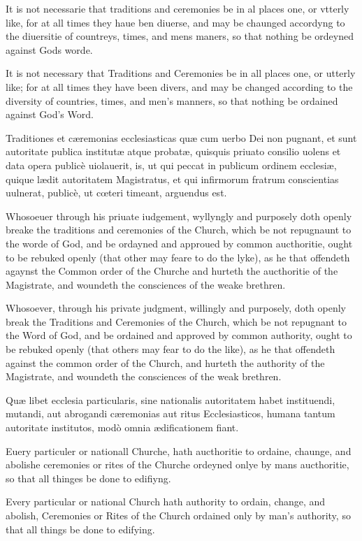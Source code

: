 It is not necessarie that traditions and ceremonies be in al places one, or vtterly like, for at all times they haue ben diuerse, and may be chaunged accordyng to the diuersitie of countreys, times, and mens maners, so that nothing be ordeyned against Gods worde.

It is not necessary that Traditions and Ceremonies be in all places one, or utterly like; for at all times they have been divers, and may be changed according to the diversity of countries, times, and men's manners, so that nothing be ordained against God's Word.

Traditiones et cæremonias ecclesiasticas quæ cum uerbo Dei non pugnant, et sunt autoritate publica institutæ atque probatæ, quisquis priuato consilio uolens et data opera publicè uiolauerit, is, ut qui peccat in publicum ordinem ecclesiæ, quique lædit autoritatem Magistratus, et qui infirmorum fratrum conscientias uulnerat, publicè, ut cœteri timeant, arguendus est.

Whosoeuer through his priuate iudgement, wyllyngly and purposely doth openly breake the traditions and ceremonies of the Church, which be not repugnaunt to the worde of God, and be ordayned and approued by common aucthoritie, ought to be rebuked openly (that other may feare to do the lyke), as he that offendeth agaynst the Common order of the Churche and hurteth the aucthoritie of the Magistrate, and woundeth the consciences of the weake brethren.

Whosoever, through his private judgment, willingly and purposely, doth openly break the Traditions and Ceremonies of the Church, which be not repugnant to the Word of God, and be ordained and approved by common authority, ought to be rebuked openly (that others may fear to do the like), as he that offendeth against the common order of the Church, and hurteth the authority of the Magistrate, and woundeth the consciences of the weak brethren.

Quæ libet ecclesia particularis, sine nationalis autoritatem habet instituendi, mutandi, aut abrogandi cæremonias aut ritus Ecclesiasticos, humana tantum autoritate institutos, modò omnia ædificationem fiant.

Euery particuler or nationall Churche, hath aucthoritie to ordaine, chaunge, and abolishe ceremonies or rites of the Churche ordeyned onlye by mans aucthoritie, so that all thinges be done to edifiyng.

Every particular or national Church hath authority to ordain, change, and abolish, Ceremonies or Rites of the Church ordained only by man's authority, so that all things be done to edifying.


